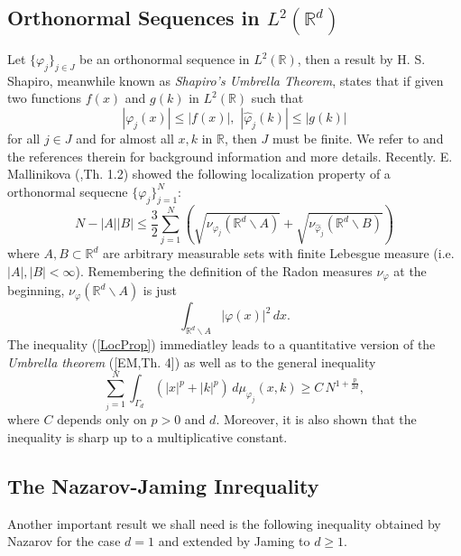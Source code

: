 \documentclass[12pt,a4paper]{article}
\newcommand{\RR}[1]{\mathbb{R}^#1}
\begin{document}
\subsection{Orthonormal Sequences in $L^2(\RR d)$}
Let $\{\varphi_j\}_{j\in J}$ be an orthonormal sequence in $L^2(\mathbb{R})$, then
a result by H. S. Shapiro, meanwhile known as {\sl Shapiro's Umbrella Theorem},
states that if given two functions $f(x)$ and $g(k)$ in $L^2(\mathbb{R})$ such that
\begin{displaymath}
         |\varphi_j(x)| \leq |f(x)|,\,\, |\hat\varphi_j(k)|\leq |g(k)|
\end{displaymath}
for all $j\in J$ and for almost all $x,k$ in $\mathbb{R}$, then $J$ must be
finite. We refer to \cite{jaming:hal-00080455} and the references therein for background information
and more details.
Recently. E. Mallinikova (\cite{malinnikova:2010},Th. 1.2) showed the following localization property of a
orthonormal sequecne $\{\varphi_j\}_{j=1}^N$: 
\begin{equation}\label{LocProp}
                N - |A| |B| \leq \frac{3}{2} \sum_{j=1}^N 
                   \left( \sqrt{\nu_{\varphi_j}({\RR d} \backslash A)} 
                      + \sqrt{\nu_{\hat\varphi_j}({\RR d} \backslash B)}                 
                   \right)
\end{equation}
where $A,B\subset {\RR d}$ are arbitrary measurable sets with finite Lebesgue
measure (i.e. $|A|,|B|<\infty$). Remembering the definition of the Radon measures
$\nu_{\varphi}$ at the beginning, $\nu_{\varphi}({\RR d} \backslash A)$ is
just 
\begin{displaymath}
          \int_{{\RR d} \backslash A} |\varphi(x)|^2\,dx.
\end{displaymath}  
The inequality (\ref{LocProp}) immediatley leads to a quantitative version of the 
{\sl Umbrella theorem} ([EM,Th. 4]) as well as to the general inequality
\begin{equation}
      \sum_{_j=1}^N \int_{\Gamma_d} \left( |x|^p+|k|^p  \right)\, 
               d\mu_{\varphi_j}(x,k) \geq C\, N^{1+\frac{p}{2 d}},
\end{equation} 
where $C$ depends only on $p>0$ and $d$. Moreover, it is also shown that the inequality is sharp up to a multiplicative constant. 
\subsection{The Nazarov-Jaming Inrequality}
Another important result we shall need is the following inequality obtained by
Nazarov for the case $d=1$ and extended by Jaming 
\cite{jaming:hal-00120268} to $d\geq 1$.
\end{document}
